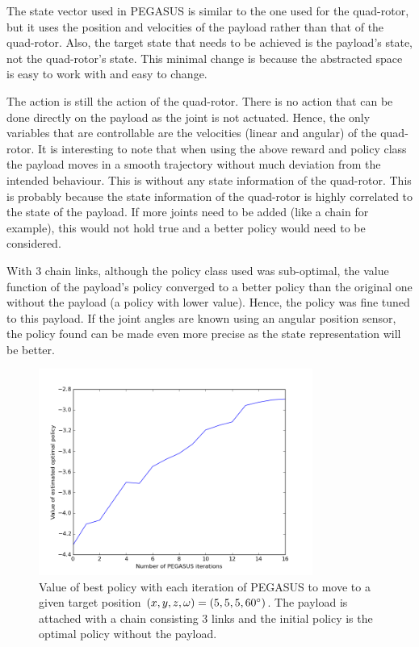 \documentclass[hidelinks,BTech]{iitmdiss}
\begin{document}
The state vector used in PEGASUS is similar to the one used for the quad-rotor, but it uses the position and velocities of the payload rather than that of the quad-rotor. Also, the target state that needs to be achieved is the payload's state, not the quad-rotor's state. This minimal change is because the abstracted space is easy to work with and easy to change.

The action is still the action of the quad-rotor. There is no action that can be done directly on the payload as the joint is not actuated. Hence, the only variables that are controllable are the velocities (linear and angular) of the quad-rotor. It is interesting to note that when using the above reward and policy class the payload moves in a smooth trajectory without much deviation from the intended behaviour. This is without any state information of the quad-rotor. This is probably because the state information of the quad-rotor is highly correlated to the state of the payload. If more joints need to be added (like a chain for example), this would not hold true and a better policy would need to be considered.

With 3 chain links, although the policy class used was sub-optimal, the value function of the payload's policy converged to a better policy than the original one without the payload (a policy with lower value). Hence, the policy was fine tuned to this payload. If the joint angles are known using an angular position sensor, the policy found can be made even more precise as the state representation will be better.

\begin{figure}[H]
  \centering
    \includegraphics[width=0.8\textwidth]{payload_position_control_time.png}
    \caption{Value of best policy with each iteration of PEGASUS to move to a given target position $(x, y, z, \omega) = (5, 5, 5, 60\protect^{\circ})$. The payload is attached with a chain consisting 3 links and the initial policy is the optimal policy without the payload.}
\end{figure}
\end{document}
